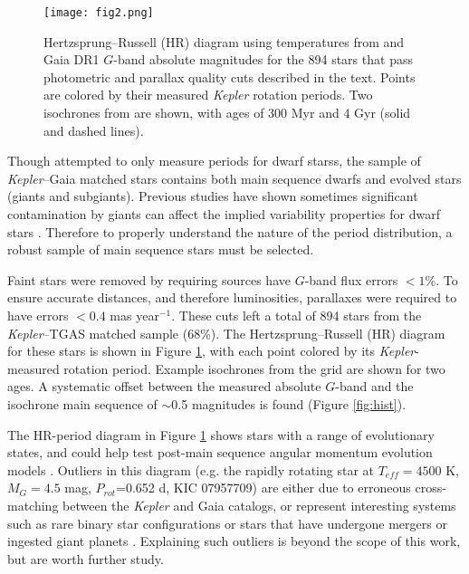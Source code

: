 \documentclass[manuscript, letterpaper]{aastex6}
\makeatletter
\let\origsection\section
\renewcommand\section{\@ifstar{\starsection}{\nostarsection}}
\newcommand\nostarsection[1]{\sectionprelude\origsection{#1}}
\newcommand\starsection[1]{\sectionprelude\origsection*{#1}}
\newcommand\sectionprelude{\vspace{1em}}
\newcommand{\Kepler}{\textsl{Kepler}\xspace}
\makeatother
\begin{document}
\begin{figure}[]
\centering
\texttt{[image: fig2.png]}
\caption{Hertzsprung--Russell (HR) diagram using temperatures from \citet{mcquillan2014} and Gaia DR1 $G$-band absolute magnitudes for the 894 stars that pass photometric and parallax quality cuts described in the text. Points are colored by their measured \Kepler rotation periods. Two isochrones from \citet{bressan2012} are shown, with ages of 300 Myr and 4 Gyr (solid and dashed lines).
}
\label{fig:HR}
\end{figure}

\section{Selecting Main Sequence Stars}

Though \citet{mcquillan2014} attempted to only measure periods for dwarf starss, the sample of \Kepler--Gaia matched stars contains both main sequence dwarfs and evolved stars (giants and subgiants). Previous studies have shown sometimes significant contamination by giants can affect the implied variability properties for dwarf stars \citep{ciardi2011,mann2012}. Therefore to properly understand the nature of the period distribution, a robust sample of main sequence stars must be selected.

Faint stars were removed by requiring sources have $G$-band flux errors $<1$\%. To ensure accurate distances, and therefore luminosities, parallaxes were required to have errors $<0.4$ mas year$^{-1}$. These cuts left a total of 894 stars from the \Kepler--TGAS matched sample (68\%). The Hertzsprung--Russell (HR) diagram for these stars is shown in Figure \ref{fig:HR}, with each point colored by its \Kepler-measured rotation period. Example isochrones from the \citet{bressan2012} grid are shown for two ages. A systematic offset between the measured absolute $G$-band and the isochrone main sequence of $\sim$0.5 magnitudes is found (Figure \ref{fig:hist}). 

The HR-period diagram in Figure \ref{fig:HR} shows stars with a range of evolutionary states, and could help test post-main sequence angular momentum evolution models \citep[e.g.][]{donascimento2012}. Outliers in this diagram (e.g. the rapidly rotating star at $T_{eff}=4500$ K, $M_G=4.5$ mag, $P_{rot}$=0.652 d, KIC 07957709) are either due to erroneous cross-matching between the \Kepler and Gaia catalogs, or represent interesting systems such as rare binary star configurations or stars that have undergone mergers or ingested giant planets \citep{massarotti2008,tayar2015}. Explaining such outliers is beyond the scope of this work, but are worth further study.
\end{document}
